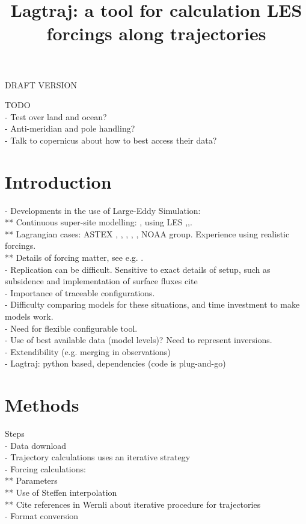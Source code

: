\documentclass[a4paper,11pt]{article}
\title{Lagtraj: a tool for calculation LES forcings along trajectories}
\begin{document}
\maketitle

DRAFT VERSION

TODO \\
- Test over land and ocean? \\
- Anti-meridian and pole handling? \\
- Talk to copernicus about how to best access their data? \\

\section{Introduction}

- Developments in the use of Large-Eddy Simulation: \\
** Continuous super-site modelling: \cite{neggers2012}, using LES \cite{schalkwijk2015},\cite{laar2019},\cite{gustafson2020}. \\
** Lagrangian cases: ASTEX \cite{bretherton1999}, \cite{roode2016}, \cite{tomassini2017}, \cite{mohrmann2019}, \cite{neggers2019}, NOAA group. Experience using realistic forcings. \\
** Details of forcing matter, see e.g. \cite{smalley2019}. \\
- Replication can be difficult. Sensitive to exact details of setup, such as subsidence \citep{kurowski2020} and implementation of surface fluxes cite \citep{stevens2001} \\
- Importance of traceable configurations. \\
- Difficulty comparing models for these situations, and time investment to make models work. \\
- Need for flexible configurable tool. \\
- Use of best available data \cite{hersbach2020} (model levels)? Need to represent inversions. \\
- Extendibility (e.g. merging in observations) \\
- Lagtraj: python based, dependencies (code is plug-and-go) \\

\section{Methods}

Steps \\
- Data download \\
- Trajectory calculations uses an iterative strategy \citep{petterssen1956,sprenger2015} \\
- Forcing calculations: \\
** Parameters \\
** Use of Steffen interpolation \citep{yamaguchi2012} \\
** Cite references in Wernli about iterative procedure for trajectories \\
- Format conversion \\
\end{document}
